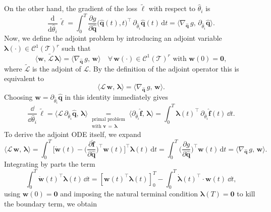 On the other hand, the gradient of the loss $\tilde{\ell}$ with respect to $\hat{\theta}_i$ is\\
$$\frac{\mathrm{d}}{\mathrm{d}\hat{\theta}_i}\,\tilde\ell
= \int_{0}^{T}
\frac{\partial g}{\partial \hat{\mathbf{q}}}\bigl(\hat{\mathbf{q}}(t),t\bigr)^{\!\top}
\,\partial_{\hat{\theta}_i}\hat{\mathbf{q}}(t)\,\mathrm{d}t
= \langle \nabla_{\hat{\mathbf{q}}}\,g,\,\partial_{\hat{\theta}_i}\hat{\mathbf{q}}\rangle.$$
Now, we define the adjoint problem by introducing an adjoint variable $\bm{\lambda}(\cdot)\in\mathcal{C}^1(\mathcal{T})^r$ such that\\
$$\langle \mathbf{w},\,\tilde{\mathcal{L}}\,\bm{\lambda}\rangle
= \langle \nabla_{\hat{\mathbf{q}}}\,g,\,\mathbf{w}\rangle
\quad\forall\,\mathbf{w}(\cdot)\in\mathcal{C}^1(\mathcal{T})^r\text{ with }\mathbf{w}(0)=\bm{0},$$
where $\tilde{\mathcal{L}}$ is the adjoint of $\mathcal{L}$.  By the definition of the adjoint operator this is equivalent to\\
$$\langle \mathcal{L}\,\mathbf{w},\,\bm{\lambda}\rangle
= \langle \nabla_{\hat{\mathbf{q}}}\,g,\,\mathbf{w}\rangle.$$
Choosing $\mathbf{w} = \partial_{\hat{\theta}_i}\hat{\mathbf{q}}$ in this identity immediately gives\\
$$\frac{\dd}{\dd\hat{\theta}_i}\,\tilde\ell
= \bigl\langle \mathcal{L}\,\partial_{\hat{\theta}_i}\hat{\mathbf{q}},\,\bm{\lambda}\bigr\rangle
\underset{
  \substack{
    \text{primal problem}\\
    \text{with }\mathbf{v}\,=\,\bm{\lambda}
  }
}{=}
\bigl\langle \partial_{\hat{\theta}_i}\hat{\mathbf{f}},\,\bm{\lambda}\bigr\rangle
= \int_{0}^{T}
  \bm{\lambda}(t)^{\!\top}\,
  \partial_{\hat{\theta}_i}\hat{\mathbf{f}}(t)\,
  \dd t.$$
To derive the adjoint ODE itself, we expand\\
$$\langle \mathcal{L}\,\mathbf{w},\,\bm{\lambda}\rangle
= \int_{0}^{T}
\Biggl[
  \dot{\mathbf{w}}(t)
  - \biggl(\dfrac{\partial\hat{\mathbf{f}}}{\partial\hat{\mathbf{q}}}\biggr)^{\!\top}
    \mathbf{w}(t)
\Biggr]^{\!\top}
\bm{\lambda}(t)\,\mathrm{d}t
= \int_{0}^{T}
\biggl(\dfrac{\partial g}{\partial\hat{\mathbf{q}}}\biggr)^{\!\top}
\mathbf{w}(t)\,\mathrm{d}t = \langle \nabla_{\hat{\mathbf{q}}}\,g,\,\mathbf{w}\rangle.$$
Integrating by parts the term\\
$$\int_{0}^{T}\dot{\mathbf{w}}(t)^{\!\top}\bm{\lambda}(t)\,\dd t =  \left[ \mathbf{w}(t)^{\top}\bm{\lambda}(t)\right]_0^T - \int_0^T \dot{\bm{\lambda}}(t)^{\top}\cdot\mathbf{w}(t)~\dd t,$$
using $\mathbf{w}(0)=\bm{0}$ and imposing the natural terminal condition $\bm{\lambda}(T)=\bm{0}$ to kill the boundary term, we obtain\\
